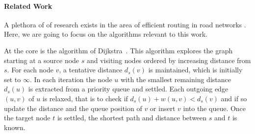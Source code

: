 \documentclass[a4paper,UKenglish,cleveref, autoref]{lipics-v2019}
\begin{document}

\paragraph*{Related Work}





A plethora of of research exists in the area of efficient routing in road networks \cite{Survey}.
Here, we are going to focus on the algorithms relevant to this work.

At the core is the algorithm of Dijkstra~\cite{Dijkstra}.
This algorithm explores the graph starting at a source node $s$ and visiting nodes ordered by increasing distance from $s$.
For each node $v$, a tentative distance $d_s(v)$ is maintained, which is initially set to $\infty$.
In each iteration the node $u$ with the smallest remaining distance $d_s(u)$ is extracted from a priority queue and settled.
Each outgoing edge $(u,v)$ of $u$ is relaxed, that is to check if $d_s(u) + w(u,v) < d_s(v)$ and if so update the distance and the queue position of $v$ or insert $v$ into the queue.
Once the target node $t$ is settled, the shortest path and distance between $s$ and $t$ is known.
\end{document}
